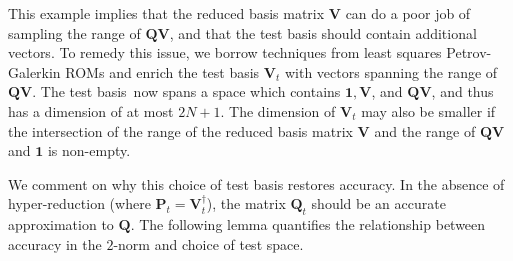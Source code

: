 \documentclass[preprint,10pt]{elsarticle}
\theoremstyle{definition}
\theoremstyle{lemma}
\theoremstyle{theorem}
\theoremstyle{assumption}
\newcommand{\td}[2]{\frac{{\rm d}#1}{{\rm d}{\rm #2}}}
\newcommand{\pd}[2]{\frac{\partial#1}{\partial#2}}
\newcommand{\LRp}[1]{\left( #1 \right)}
\begin{document}
This example implies that the reduced basis matrix $\bm{V}$ can do a poor job of sampling the range of $\bm{Q}\bm{V}$, and that the test basis should contain additional vectors.  To remedy this issue, we borrow techniques from least squares Petrov-Galerkin ROMs \cite{carlberg2011efficient, carlberg2017galerkin} and enrich the test basis $\bm{V}_t$ with vectors spanning the range of $\bm{Q}\bm{V}$.  The test basis now spans a space which contains $\bm{1}, \bm{V}$, and $\bm{Q}\bm{V}$, and thus has a dimension of at most $2N+1$.  The dimension of $\bm{V}_t$ may also be smaller if the intersection of the range of the reduced basis matrix $\bm{V}$ and the range of $\bm{Q}\bm{V}$ and $\bm{1}$ is non-empty.  

We comment on why this choice of test basis restores accuracy.  
In the absence of hyper-reduction (where $\bm{P}_t = \bm{V}_t^{\dagger}$), the matrix $\bm{Q}_t$ should be an accurate approximation to $\bm{Q}$.  The following lemma quantifies the relationship between accuracy in the $2$-norm and choice of test space.  
\end{document}
